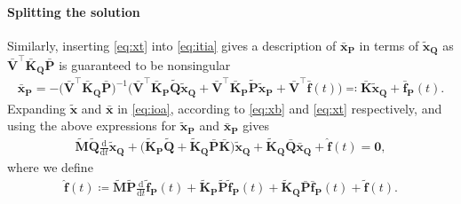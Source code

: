 \documentclass[AMA,STIX1COL]{WileyNJD-v2}
\newcommand{\mb}[1]{\mathbf{#1}}
\newcommand{\mbt}[1]{\tilde{\mathbf{#1}}}
\newcommand{\mbb}[1]{\bar{\mathbf{#1}}}
\newcommand{\mbh}[1]{\hat{\mathbf{#1}}}
\newcommand{\T}{{\!\top}}
\newcommand{\ddt}{\frac{\mathrm{d}}{\mathrm{d}t}}
\begin{document}
\paragraph{Splitting the solution}
Similarly, inserting \eqref{eq:xt} into \eqref{eq:itia} gives a description of $\mbb{x}_\mb{P}$ in terms of $\mbt{x}_\mb{Q}$ as $\mbb{V}^{\T} \mbb{K}_\mb{Q} \mbb{P}$ is guaranteed to be nonsingular
\begin{align*}
    \mbb{x}_\mb{P} = -\big( \mbb{V}^{\T} \mbb{K}_\mb{Q} \mbb{P} \big)^{-1} \big( \mbb{V}^{\T} \mbb{K}_\mb{P} \mbt{Q} \mbt{x}_\mb{Q} + \mbb{V}^{\T} \mbb{K}_\mb{P} \mbt{P} \mbt{x}_\mb{P} + \mbb{V}^{\T} \mbb{f}(t) \big) \eqqcolon \mbb{K} \mbt{x}_\mb{Q} + \mbb{f}_\mb{P}(t).
\end{align*}
Expanding $\mbt{x}$ and $\mbb{x}$ in \eqref{eq:ioa}, according to \eqref{eq:xb} and \eqref{eq:xt} respectively, and using the above expressions for $\mbt{x}_\mb{P}$ and $\mbb{x}_\mb{P}$ gives
\begin{align}
    \mbt{M} \mbt{Q} \ddt \mbt{x}_\mb{Q} + \big( \mbt{K}_\mb{P} \mbt{Q} + \mbt{K}_\mb{Q} \mbb{P} \mbb{K} \big) \mbt{x}_\mb{Q} + \mbt{K}_\mb{Q} \mbb{Q} \mbb{x}_\mb{Q} + \mbh{f}(t) = \mb{0} \label{eq:itii},
\end{align}
where we define
\begin{align*}
    \mbh{f}(t) \coloneqq \mbt{M} \mbt{P} \ddt \mbt{f}_\mb{P}(t) + \mbt{K}_\mb{P} \mbt{P} \mbt{f}_\mb{P}(t) + \mbt{K}_\mb{Q} \mbb{P} \mbb{f}_\mb{P}(t) + \mbt{f}(t).
\end{align*}
\end{document}
